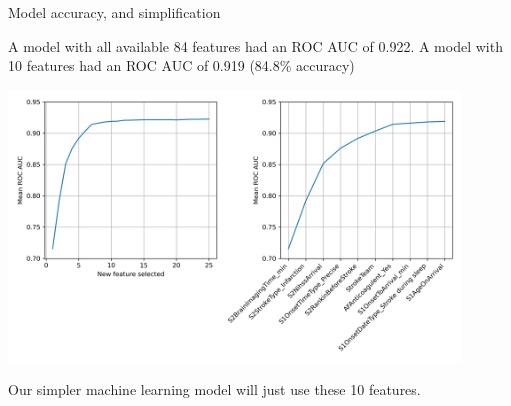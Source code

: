 \begin{frame}{Model accuracy, and simplification}

A model with all available 84 features had an ROC AUC of 0.922. A model with 10 features had an ROC AUC of 0.919 (84.8\% accuracy)

\begin{center}
\includegraphics[width=0.9\textwidth]{./images/01_feature_selection.jpg}
\end{center}

Our simpler machine learning model will just use these 10 features.

\end{frame}